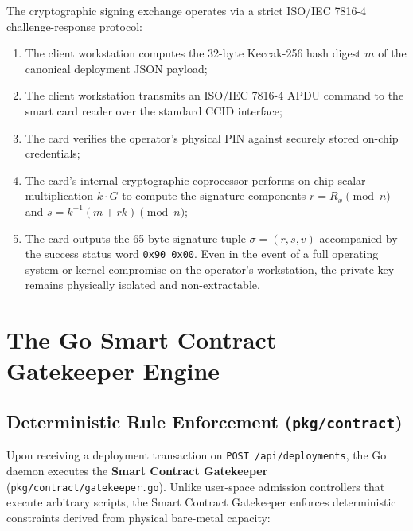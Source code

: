 \documentclass[a4paper,12pt]{article}
\begin{document}
The cryptographic signing exchange operates via a strict ISO/IEC 7816-4 challenge-response protocol:
\begin{enumerate}[leftmargin=1.2cm]
    \item The client workstation computes the 32-byte Keccak-256 hash digest $m$ of the canonical deployment JSON payload;
    \item The client workstation transmits an ISO/IEC 7816-4 APDU command to the smart card reader over the standard CCID interface;
    \item The card verifies the operator's physical PIN against securely stored on-chip credentials;
    \item The card's internal cryptographic coprocessor performs on-chip scalar multiplication $k \cdot G$ to compute the signature components $r = R_x \pmod n$ and $s = k^{-1}(m + r k) \pmod n$;
    \item The card outputs the 65-byte signature tuple $\sigma = (r, s, v)$ accompanied by the success status word \texttt{0x90 0x00}. Even in the event of a full operating system or kernel compromise on the operator's workstation, the private key remains physically isolated and non-extractable.
\end{enumerate}

\newpage

\section{The Go Smart Contract Gatekeeper Engine}

\subsection{Deterministic Rule Enforcement (\texttt{pkg/contract})}

Upon receiving a deployment transaction on \texttt{POST /api/deployments}, the Go daemon executes the \textbf{Smart Contract Gatekeeper} (\texttt{pkg/contract/gatekeeper.go}). Unlike user-space admission controllers that execute arbitrary scripts, the Smart Contract Gatekeeper enforces deterministic constraints derived from physical bare-metal capacity:
\end{document}
